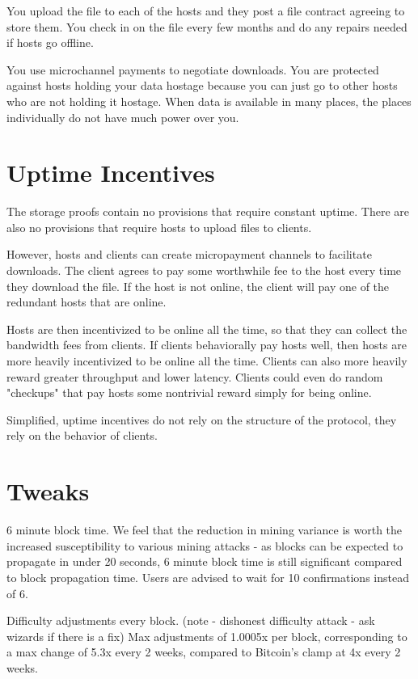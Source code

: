 \documentclass[twocolumn]{article}
\begin{document}
You upload the file to each of the hosts and they post a file contract agreeing to store them.
You check in on the file every few months and do any repairs needed if hosts go offline.

You use microchannel payments to negotiate downloads.
You are protected against hosts holding your data hostage because you can just go to other hosts who are not holding it hostage.
When data is available in many places, the places individually do not have much power over you.

\section{Uptime Incentives}
The storage proofs contain no provisions that require constant uptime.
There are also no provisions that require hosts to upload files to clients.

However, hosts and clients can create micropayment channels to facilitate downloads.
The client agrees to pay some worthwhile fee to the host every time they download the file.
If the host is not online, the client will pay one of the redundant hosts that are online.

Hosts are then incentivized to be online all the time, so that they can collect the bandwidth fees from clients.
If clients behaviorally pay hosts well, then hosts are more heavily incentivized to be online all the time.
Clients can also more heavily reward greater throughput and lower latency.
Clients could even do random "checkups" that pay hosts some nontrivial reward simply for being online.

Simplified, uptime incentives do not rely on the structure of the protocol, they rely on the behavior of clients.

\section{Tweaks}
6 minute block time. We feel that the reduction in mining variance is worth the increased susceptibility to various mining attacks - as blocks can be expected to propagate in under 20 seconds, 6 minute block time is still significant compared to block propagation time.
Users are advised to wait for 10 confirmations instead of 6.

Difficulty adjustments every block. (note - dishonest difficulty attack - ask wizards if there is a fix)
Max adjustments of 1.0005x per block, corresponding to a max change of 5.3x every 2 weeks, compared to Bitcoin's clamp at 4x every 2 weeks.
\end{document}
